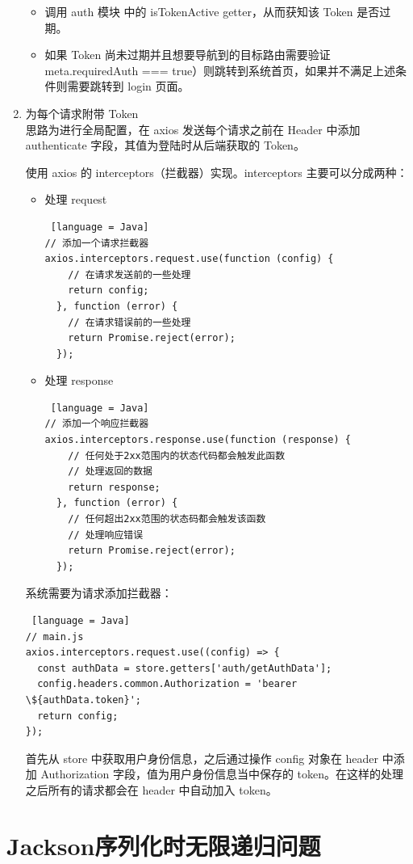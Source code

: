 \begin{enumerate}
\begin{itemize}
          \item 调用 auth 模块 中的 isTokenActive getter，从而获知该 Token 是否过期。
          \item 如果 Token 尚未过期并且想要导航到的目标路由需要验证\\meta.requiredAuth === true）则跳转到系统首页，如果并不满足上述条件则需要跳转到 login 页面。
        \end{itemize}
  \item 为每个请求附带 Token\\
        思路为进行全局配置，在 axios 发送每个请求之前在 Header 中添加 authenticate 字段，其值为登陆时从后端获取的 Token。

        使用 axios 的 interceptors（拦截器）实现。interceptors 主要可以分成两种：
        \begin{itemize}
          \item 处理 request
                \begin{lstlisting} [language = Java]
// 添加一个请求拦截器
axios.interceptors.request.use(function (config) {
    // 在请求发送前的一些处理
    return config;
  }, function (error) {
    // 在请求错误前的一些处理
    return Promise.reject(error);
  });

                \end{lstlisting}
          \item 处理 response
                \begin{lstlisting} [language = Java]
// 添加一个响应拦截器
axios.interceptors.response.use(function (response) {
    // 任何处于2xx范围内的状态代码都会触发此函数
    // 处理返回的数据
    return response;
  }, function (error) {
    // 任何超出2xx范围的状态码都会触发该函数
    // 处理响应错误
    return Promise.reject(error);
  });
\end{lstlisting}
        \end{itemize}
        系统需要为请求添加拦截器：
        \begin{lstlisting} [language = Java]
// main.js
axios.interceptors.request.use((config) => {
  const authData = store.getters['auth/getAuthData'];
  config.headers.common.Authorization = 'bearer \${authData.token}';
  return config;
});
    \end{lstlisting}
        首先从 store 中获取用户身份信息，之后通过操作 config 对象在 header 中添加 Authorization 字段，值为用户身份信息当中保存的 token。在这样的处理之后所有的请求都会在 header 中自动加入 token。
\end{enumerate}

\section{Jackson序列化时无限递归问题}

